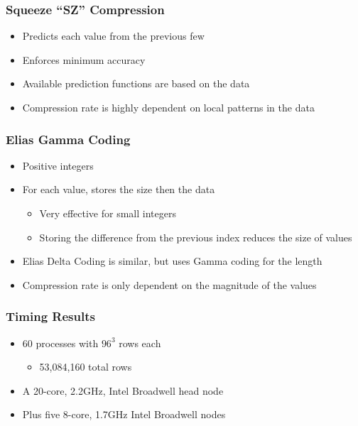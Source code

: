 \documentclass{beamer}
\begin{document}
\begin{frame}
	\frametitle{Squeeze ``SZ'' Compression}
	\begin{itemize}
		\item Predicts each value from the previous few
		\item Enforces minimum accuracy
		\pause
		\item Available prediction functions are based on the data
		\pause
		\item Compression rate is highly dependent on local patterns in the data
	\end{itemize}
\end{frame}

\begin{frame}
	\frametitle{Elias Gamma Coding}
	\begin{itemize}
		\item Positive integers
		\item For each value, stores the size then the data
		\begin{itemize}
			\item Very effective for small integers
			\item Storing the difference from the previous index reduces the size of values
		\end{itemize}
		\pause
		\item Elias Delta Coding is similar, but uses Gamma coding for the length
		\pause
		\item Compression rate is only dependent on the magnitude of the values
	\end{itemize}
\end{frame}

\begin{frame}
	\frametitle{Timing Results}
	\begin{itemize}
		\item 60 processes with \(96^3\) rows each
		\begin{itemize}
			\item 53,084,160 total rows
		\end{itemize}
		\item A 20-core, 2.2GHz, Intel Broadwell head node
		\item Plus five 8-core, 1.7GHz Intel Broadwell nodes
	\end{itemize}
\end{frame}
\end{document}
